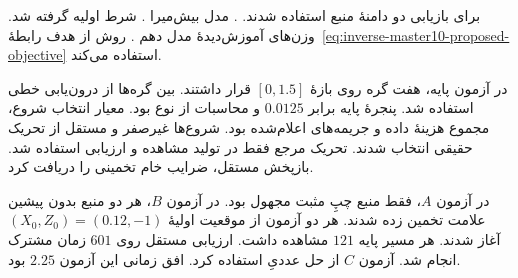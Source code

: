 \clearpage
{}
\label{sec:results-master10-inverse-pending}

 برای بازیابی دو دامنهٔ منبع استفاده شدند.
.
مدل بیش‌میرا .
شرط اولیه  گرفته شد.
وزن‌های آموزش‌دیدهٔ مدل دهم .
روش از هدف رابطهٔ~\eqref{eq:inverse-master10-proposed-objective} استفاده می‌کند.

در آزمون پایه، هفت گره روی بازهٔ $[0,1.5]$ قرار داشتند.
بین گره‌ها از درون‌یابی خطی استفاده شد.
پنجرهٔ پایه برابر $0.0125$ و محاسبات از نوع  بود.
معیار انتخاب شروع، مجموع هزینهٔ داده و جریمه‌های اعلام‌شده بود.
شروع‌ها غیرصفر و مستقل از تحریک حقیقی انتخاب شدند.
تحریک مرجع فقط در تولید مشاهده و ارزیابی استفاده شد.
بازپخش مستقل، ضرایب خام تخمینی را دریافت کرد.

در آزمون $A$، فقط منبع چپِ مثبت مجهول بود.
در آزمون $B$، هر دو منبع بدون پیشین علامت تخمین زده شدند.
هر دو آزمون از موقعیت اولیهٔ $(X_0,Z_0)=(0.12,-1)$ آغاز شدند.
هر مسیر پایه $121$ مشاهده داشت.
ارزیابی مستقل روی $601$ زمان مشترک انجام شد.
آزمون $C$ از حل عددیِ  استفاده کرد.
افق زمانی این آزمون $2.25$ بود.

